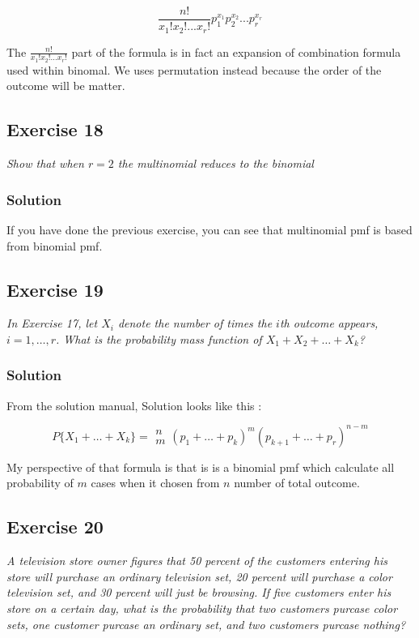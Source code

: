 \documentclass[12pt,a4paper]{article}
\begin{document}
\[
\frac{n!}{x_1! x_2! ... x_r!} 
p_1^{x_1} p_2^{x_2} ... p_r^{x_r}
\]

The $\frac{n!}{x_1! x_2! ... x_r!}$  part of the formula is in fact an expansion of combination formula used within binomal. We uses permutation instead because the order of the outcome will be matter.


\subsection{Exercise 18}

\textit{Show that when $r=2$ the multinomial reduces to the binomial}

\subsubsection{Solution}

If you have done the previous exercise, you can see that multinomial pmf is based from binomial pmf.


\subsection{Exercise 19}

\textit{In Exercise 17, let $X_i$ denote the number of times the $i$th outcome appears, $i=1,\dots,r$. What is the probability mass function of $X_1 + X_2 + \dots + X_k$?}

\subsubsection{Solution}

From the solution manual, Solution looks like this :

\[
P\{X_1 + \dots + X_k\} = \begin{array}{c}n\\m\end{array} (p_1 + \dots + p_k)^{m} (p_{k+1} + \dots + p_{r})^{n-m}
\]

My perspective of that formula is that is is a binomial pmf which calculate all probability of $m$ cases when it chosen from $n$ number of total outcome.

\subsection{Exercise 20}

\textit{A television store owner figures that 50 percent of the customers entering his store will purchase an ordinary television set, 20 percent will purchase a color television set, and 30 percent will just be browsing. If five customers enter his store on a certain day, what is the probability that two customers purcase color sets, one customer purcase an ordinary set, and two customers purcase nothing?}
\end{document}
